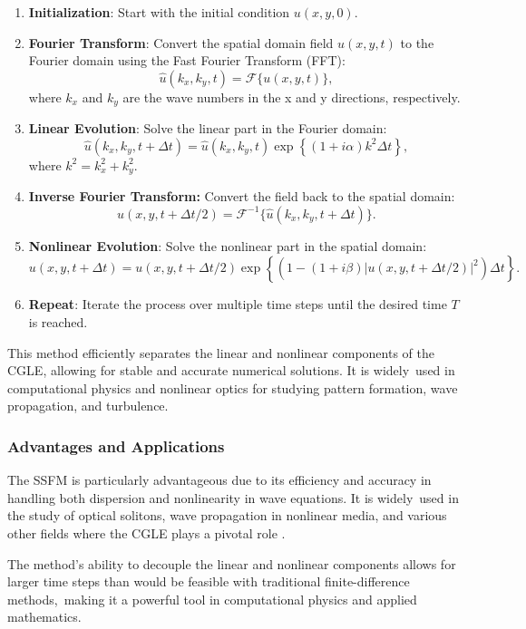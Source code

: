 \begin{enumerate}
  \item \textbf{Initialization}: Start with the initial condition $u(x, y, 0)$.
  
  \item \textbf{Fourier Transform}: Convert the spatial domain field $u(x, y, t)$ to the Fourier domain using the Fast Fourier Transform (FFT):
  \begin{equation}
      \hat{u}(k_x, k_y, t) = \mathcal{F}\{u(x, y, t)\},
  \end{equation}
  where $k_x$ and $k_y$ are the wave numbers in the x and y directions, respectively.  

  \item \textbf{Linear Evolution}: Solve the linear part in the Fourier domain:
  \begin{equation}
      \hat{u}(k_x, k_y, t + \Delta t) = \hat{u}(k_x, k_y, t) \exp\left\{(1 + i\alpha)k^2 \Delta t\right\},
  \end{equation}
  where $k^2 = k_x^2 + k_y^2$.

  \item \textbf{Inverse Fourier Transform:} Convert the field back to the spatial domain:
  \begin{equation}
      u(x, y, t + \Delta t/2) = \mathcal{F}^{-1}\{\hat{u}(k_x, k_y, t + \Delta t)\}.
  \end{equation}

  \item \textbf{Nonlinear Evolution}: Solve the nonlinear part in the spatial domain:
  \begin{equation}
      u(x, y, t + \Delta t) = u(x, y, t + \Delta t/2) \exp\left\{(1 - (1 + i\beta)|u(x, y, t + \Delta t/2)|^2) \Delta t\right\}.
  \end{equation}

  \item \textbf{Repeat}: Iterate the process over multiple time steps until the desired time $T$ is reached.

\end{enumerate}


This method efficiently separates the linear and nonlinear components of the CGLE, allowing for stable and accurate numerical solutions. It is widely\
used in computational physics and nonlinear optics for studying pattern formation, wave propagation, and turbulence.
\subsubsection{Advantages and Applications}
The SSFM is particularly advantageous due to its efficiency and accuracy in handling both dispersion and nonlinearity in wave equations. It is widely\
used in the study of optical solitons, wave propagation in nonlinear media, and various other fields where the CGLE plays a pivotal role \cite{wangEfficientSplitstepCompact2013, goldmanNovelMethodSimulating1995,agrawalNonlinearFiberOptics2001}.

The method's ability to decouple the linear and nonlinear components allows for larger time steps than would be feasible with traditional finite-difference methods,\
making it a powerful tool in computational physics and applied mathematics.

